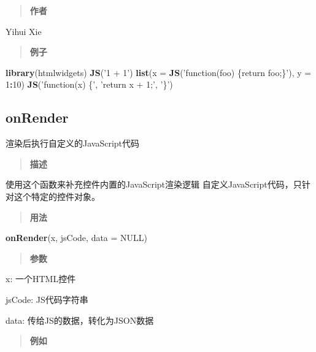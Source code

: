 \documentclass[]{book}
\newenvironment{Shaded}{\begin{snugshade}}{\end{snugshade}}
\newcommand{\KeywordTok}[1]{\textcolor[rgb]{0.13,0.29,0.53}{\textbf{#1}}}
\newcommand{\DataTypeTok}[1]{\textcolor[rgb]{0.13,0.29,0.53}{#1}}
\newcommand{\DecValTok}[1]{\textcolor[rgb]{0.00,0.00,0.81}{#1}}
\newcommand{\StringTok}[1]{\textcolor[rgb]{0.31,0.60,0.02}{#1}}
\newcommand{\OtherTok}[1]{\textcolor[rgb]{0.56,0.35,0.01}{#1}}
\newcommand{\OperatorTok}[1]{\textcolor[rgb]{0.81,0.36,0.00}{\textbf{#1}}}
\newcommand{\NormalTok}[1]{#1}
\theoremstyle{definition}
\theoremstyle{definition}
\theoremstyle{definition}
\theoremstyle{remark}
\begin{document}
\begin{quote}
\textbf{作者}
\end{quote}

Yihui Xie

\begin{quote}
\textbf{例子}
\end{quote}

\begin{Shaded}
\begin{Highlighting}[]
\KeywordTok{library}\NormalTok{(htmlwidgets)}
\KeywordTok{JS}\NormalTok{(}\StringTok{'1 + 1'}\NormalTok{)}
\KeywordTok{list}\NormalTok{(}\DataTypeTok{x =} \KeywordTok{JS}\NormalTok{(}\StringTok{'function(foo) \{return foo;\}'}\NormalTok{), }\DataTypeTok{y =} \DecValTok{1}\OperatorTok{:}\DecValTok{10}\NormalTok{)}
\KeywordTok{JS}\NormalTok{(}\StringTok{'function(x) \{'}\NormalTok{, }\StringTok{'return x + 1;'}\NormalTok{, }\StringTok{'\}'}\NormalTok{)}
\end{Highlighting}
\end{Shaded}

\subsection{onRender}\label{onrender}

渲染后执行自定义的JavaScript代码

\begin{quote}
\textbf{描述}
\end{quote}

使用这个函数来补充控件内置的JavaScript渲染逻辑
自定义JavaScript代码，只针对这个特定的控件对象。

\begin{quote}
\textbf{用法}
\end{quote}

\begin{Shaded}
\begin{Highlighting}[]
\KeywordTok{onRender}\NormalTok{(x, jsCode, }\DataTypeTok{data =} \OtherTok{NULL}\NormalTok{)}
\end{Highlighting}
\end{Shaded}

\begin{quote}
\textbf{参数}
\end{quote}

x: 一个HTML控件

jsCode: JS代码字符串

data: 传给JS的数据，转化为JSON数据

\begin{quote}
\textbf{例如}
\end{quote}
\end{document}
